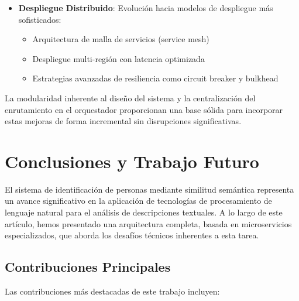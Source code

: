 \documentclass[12pt,a4paper]{article}
\begin{document}
\begin{itemize}
    \item \textbf{Despliegue Distribuido}: Evolución hacia modelos de despliegue más sofisticados:
    \begin{itemize}
        \item Arquitectura de malla de servicios (service mesh)
        \item Despliegue multi-región con latencia optimizada
        \item Estrategias avanzadas de resiliencia como circuit breaker y bulkhead
    \end{itemize}
\end{itemize}

La modularidad inherente al diseño del sistema y la centralización del enrutamiento en el orquestador proporcionan una base sólida para incorporar estas mejoras de forma incremental sin disrupciones significativas.

\section{Conclusiones y Trabajo Futuro}
\label{sec:conclusiones}

El sistema de identificación de personas mediante similitud semántica representa un avance significativo en la aplicación de tecnologías de procesamiento de lenguaje natural para el análisis de descripciones textuales. A lo largo de este artículo, hemos presentado una arquitectura completa, basada en microservicios especializados, que aborda los desafíos técnicos inherentes a esta tarea.

\subsection{Contribuciones Principales}
\label{subsec:contribuciones}

Las contribuciones más destacadas de este trabajo incluyen:
\end{document}
